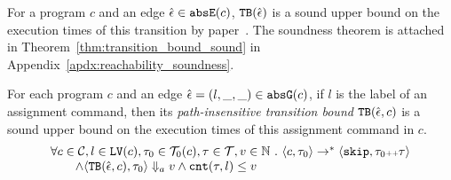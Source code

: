 \begin{enumerate}
For a program $c$ and an edge $\hat{\mathtt{\epsilon}{}} \in \mathtt{abs}{\mathtt{E}}(c)$,
${\mathtt{TB}}(\hat{\mathtt{\epsilon}{}})$ is a sound upper bound
on the execution times of this transition by paper~\cite{sinn2017complexity}.
The soundness theorem is attached in Theorem~\ref{thm:transition_bound_sound} in Appendix~\ref{apdx:reachability_soundness}.
%
\begin{thm}
  \label{thm:transition_bound_sound}
For each program ${c}$ and an edge $\hat{\mathtt{\epsilon}{}} = (l, \_, \_) \in \mathtt{abs}{\mathtt{G}}(c)$, if $l$ is the label of an assignment command,
then its \emph{path-insensitive transition bound} ${\mathtt{TB}}(\hat{\mathtt{\epsilon}{}}, c)$ 
 is a sound upper bound on 
the execution times of this assignment command in $c$.
  \[
    \begin{array}{l}
      \forall c \in \mathcal{C}, l \in \mathtt{LV}(c),\mathtt{\tau}_0 \in \mathcal{T}_0(c), 
      \mathtt{\tau} \in \mathcal{T}, v \in \mathbb{N}
       ~.~ 
       \langle {c}, \mathtt{\tau}_0 \rangle \to^{*} \langle \mathtt{skip}, \mathtt{\tau}_0{\scriptscriptstyle ++}\mathtt{\tau} \rangle 
       \\ \qquad 
       \land \langle {\ensuremath{\mathtt{TB}}}(\hat{\mathtt{\epsilon}{}}, c), \mathtt{\tau}_0 \rangle \Downarrow_a v
       \land
      \mathtt{cnt}(\mathtt{\tau}, l) \leq v
    \end{array}
    \]
\end{thm}
%

\end{enumerate}
